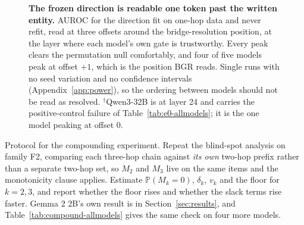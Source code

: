 \documentclass{article}
\newif\ifredflags
\newcommand{\rf}[1]{\ifredflags{\textcolor{red}{\textbf{[MISSING: #1]}}}\fi}
\begin{document}
\begin{figure}[tb]
\vspace{-0.4em}
\caption{\textbf{The frozen direction is readable one token past the written entity.} AUROC for the
direction fit on one-hop data and never refit, read at three offsets around the bridge-resolution
position, at the layer where each model's own gate is trustworthy.
\rf{the target these AUROCs are computed against. The manuscript never states whether the sweep scores
$K_2$, $M$ or $Y$, and the figure cannot label its own axis until it does.} Every peak clears
the permutation null comfortably, and four of five models peak at offset $+1$, which is the position
BGR reads. Single runs with no seed variation and no confidence intervals
(Appendix~\ref{app:power}), so the ordering between models should not be read as resolved.
$^{\dagger}$Qwen3-32B is at layer 24 and carries the positive-control failure of
Table~\ref{tab:e0-allmodels}; it is the one model peaking at offset $0$.}
\label{fig:offsets}
\end{figure}


Protocol for the compounding experiment. Repeat the blind-spot analysis on family F2, comparing each
three-hop chain against \emph{its own} two-hop
prefix rather than a separate two-hop set, so $M_2$ and $M_3$ live on the same items and the
monotonicity clause applies. Estimate $\mathbb{P}(M_k=0)$, $\delta_k$, $v_k$ and the floor for
$k=2,3$, and report whether the floor rises and whether the slack terms rise faster. Gemma 2 2B's own
result is in Section~\ref{sec:results}, and Table~\ref{tab:compound-allmodels} gives the same check on
four more models.
\end{document}
